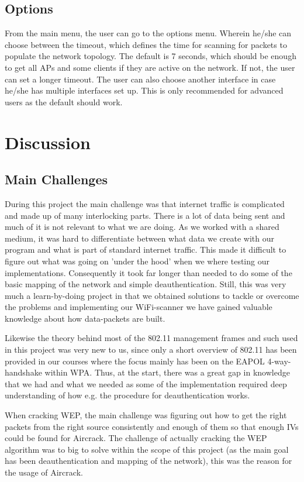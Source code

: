 \subsection{Options}
From the main menu, the user can go to the options menu. Wherein he/she can choose between the timeout, which defines the time for scanning for packets to populate the network topology. The default is 7 seconds, which should be enough to get all APs and some clients if they are active on the network. If not, the user can set a longer timeout. The user can also choose another interface in case he/she has multiple interfaces set up. This is only recommended for advanced users as the default should work.

\section{Discussion}


\subsection{Main Challenges}

During this project the main challenge was that internet traffic is complicated and made up of many interlocking parts. There is a lot of data being sent and much of it is not relevant to what we are doing. As we worked with a shared medium, it was hard to differentiate between what data we create with our program and what is part of standard internet traffic. This made it difficult to figure out what was going on 'under the hood' when we where testing our implementations. Consequently it took far longer than needed to do some of the basic mapping of the network and simple deauthentication. Still, this was very much a learn-by-doing project in that we obtained solutions to tackle or overcome the problems and implementing our WiFi-scanner we have gained valuable knowledge about how data-packets are built. 

Likewise the theory behind most of the 802.11 management frames and such used in this project was very new to us, since only a short overview of 802.11 has been provided in our courses where the focus mainly has been on the EAPOL 4-way-handshake within WPA. Thus, at the start, there was a great gap in knowledge that we had and what we needed as some of the implementation required deep understanding of how e.g. the procedure for deauthentication works.

When cracking WEP, the main challenge was figuring out how to get the right packets from the right source consistently and enough of them so that enough IVs could be found for Aircrack. The challenge of actually cracking the WEP algorithm was to big to solve within the scope of this project (as the main goal has been deauthentication and mapping of the network), this was the reason for the usage of Aircrack.

